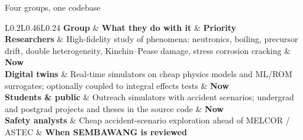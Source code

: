 \documentclass[aspectratio=169]{beamer}
\newcommand{\roadtab}[1]{{\footnotesize\setlength{\tabcolsep}{4pt}#1}}
\begin{document}
\begin{frame}{Four groups, one codebase}
    \roadtab{
    \begin{tabular}{L{0.2\textwidth}L{0.46\textwidth}L{0.24\textwidth}}
        \toprule
        \textbf{Group} & \textbf{What they do with it} & \textbf{Priority} \\
        \midrule
        \textbf{Researchers} & High-fidelity study of phenomena: neutronics,
            boiling, precursor drift, double heterogeneity, Kinchin--Pease
            damage, stress corrosion cracking
            & \textbf{Now} \\[2pt]
        \textbf{Digital twins} & Real-time simulators on cheap physics models
            and ML/ROM surrogates; optionally coupled to integral effects tests
            & \textbf{Now} \\[2pt]
        \textbf{Students \& public} & Outreach simulators with accident
            scenarios; undergrad and postgrad projects and theses in the
            source code
            & \textbf{Now} \\[2pt]
        \textbf{Safety analysts} & Cheap accident-scenario exploration ahead of
            MELCOR / ASTEC
            & \textbf{When SEMBAWANG is reviewed} \\
        \bottomrule
    \end{tabular}}
\end{frame}
\end{document}
